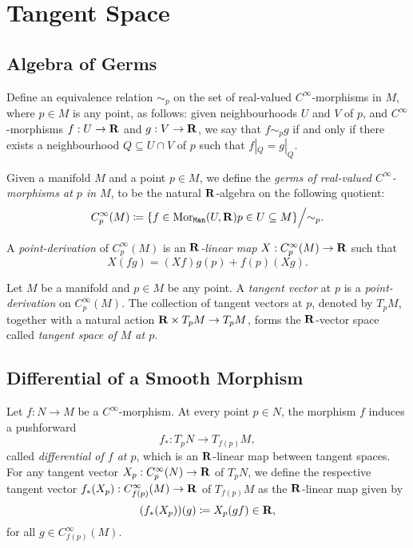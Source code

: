 \section{Tangent Space}

\subsection{Algebra of Germs}

Define an equivalence relation \(\sim_p\) on the set of real-valued
\(C^{\infty}\)-morphisms in \(M\), where \(p \in M\) is any point, as follows:
given neighbourhoods \(U\) and \(V\) of \(p\), and \(C^{\infty}\)-morphisms
\(f: U \to \mathbf{R}\) and \(g: V \to \mathbf{R}\), we say that \(f \sim_p g\) if and only if
there exists a neighbourhood \(Q \subseteq U \cap V\) of \(p\) such that
\(f|_Q = g|_Q\).

\begin{definition}
    \label{def:algebra-of-germs-manifold}
    Given a manifold \(M\) and a point \(p \in M\), we define the \emph{germs of
        real-valued \(C^{\infty}\)-morphisms at \(p\) in \(M\)}, to be the natural
    \(\mathbf{R}\)-algebra on the following quotient:
    \[
        C_p^{\infty}(M) \coloneq
        \{f \in \operatorname{Mor}_{{\texttt{Man}}}(U, \mathbf{R}) \relax p \in U \subseteq M\}
        \Big/{\sim_p}.
    \]

    A \emph{point-derivation} of \(C_p^{\infty}(M)\) is an \emph{\(\mathbf{R}\)-linear map}
    \(X: C_p^{\infty}(M) \to \mathbf{R}\) such that
    \[
        X(f g) = (X f) g(p) + f(p) (X g).
    \]
\end{definition}

\begin{definition}
    \label{def:tangent-vector-at-point-manifold}
    Let \(M\) be a manifold and \(p \in M\) be any point. A \emph{tangent vector} at
    \(p\) is a \emph{point-derivation} on \(C_p^{\infty}(M)\). The collection of
    tangent vectors at \(p\), denoted by \(T_p M\), together with a natural action
    \(\mathbf{R} \times T_p M \to T_p M\), forms the \(\mathbf{R}\)-vector space called
    \emph{tangent space of \(M\) at \(p\)}.
\end{definition}

\subsection{Differential of a Smooth Morphism}

\begin{definition}
    \label{def:differential-at-a-point}
    Let \(f: N \to M\) be a \(C^{\infty}\)-morphism. At every point \(p \in N\), the
    morphism \(f\) induces a pushforward
    \[
        f_{*}: T_p N \longrightarrow T_{f(p)} M,
    \]
    called \emph{differential of \(f\) at \(p\)}, which is an \(\mathbf{R}\)-linear map
    between tangent spaces. For any tangent vector \(X_p: C_p^{\infty}(N) \to \mathbf{R}\) of
    \(T_p N\), we define the respective tangent vector
    \(f_{*}(X_p): C_{f(p)}^{\infty}(M) \to \mathbf{R}\) of \(T_{f(p)} M\) as the
    \(\mathbf{R}\)-linear map given by
    \[
        (f_{*}(X_p))(g) \coloneq X_p(g f) \in \mathbf{R},
    \]
    for all \(g \in C_{f(p)}^{\infty}(M)\).
\end{definition}


